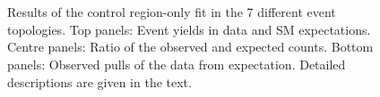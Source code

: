 \begin{figure}[!h]
{  }\\
  ~ 
  \\
  \caption{\label{fig:cr-fit} Results of the control region-only fit in the 7 different event topologies.
  Top panels:  Event yields in data and SM expectations.
  Centre panels:  Ratio of the observed and expected counts.
  Bottom panels:  Observed pulls of the data from expectation.
  Detailed descriptions are given in the text.
	}
\end{figure}

